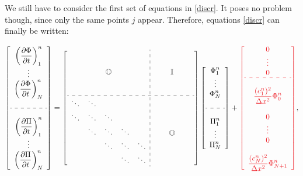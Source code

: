 \documentclass{article}
\begin{document}
We still have to consider the first set of equations in \eqref{discr}. It poses no problem though, since only the same points $j$ appear. Therefore, equations \eqref{discr} can finally be written:

\begin{equation}\label{syst}
\left[\begin{array}{c}
\displaystyle\left(\frac{\partial \Phi}{\partial t}\right)^n_1\\
\vdots\\
\displaystyle\left(\frac{\partial \Phi}{\partial t}\right)^n_N\\
\text{ }\\
\hdashline\\
\displaystyle\left(\frac{\partial \Pi}{\partial t}\right)^n_1\\
\vdots\\
\displaystyle\left(\frac{\partial \Pi}{\partial t}\right)^n_N
\end{array}\right]=\textcolor{grayII}{\left[\begin{array}{ccccc:ccccc}
 & & & & & & & & & \\
 & & & & & & & & & \\
 & &\displaystyle\mathbb{O}& & & & &\displaystyle\mathbb{I}& & \\
 & & & & & & & & & \\
 & & & & & & & & & \\
\hdashline
 \ddots&\ddots& & & & & & & & \\
\ddots&\ddots&\ddots& & & & & & & \\
 &\ddots&\ddots&\ddots& & & &\displaystyle\mathbb{O}& & \\
 & &\ddots&\ddots&\ddots& & & & & \\
 & & &\ddots&\ddots& & & & & 
\end{array}\right]} \left[\begin{array}{c}\displaystyle\Phi^n_1\\\vdots\\\displaystyle\Phi^n_N\\\text{ }\\\hdashline\\\displaystyle\Pi^n_1\\\vdots\\\displaystyle\Pi^n_N\end{array}\right]+\textcolor{Red}{\left[\begin{array}{c}0\\\vdots\\0\\\hdashline\\\displaystyle\frac{(c^n_1)^2}{\Delta x^2}\Phi^n_0\\\text{ }\\0\\\vdots\\0\\\text{ }\\\displaystyle\frac{(c^n_N)^2}{\Delta x^2}\Phi^n_{N+1}\end{array}\right]},
\end{equation}
\end{document}
